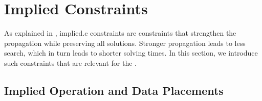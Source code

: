 \section{Implied Constraints}

As explained in , \gls{implied.c}
\glspl{constraint} are \glspl{constraint} that strengthen the \gls{propagation}
while preserving all \glspl{solution}.
%
Stronger \gls{propagation} leads to less \gls{search}, which in turn leads to
shorter solving times.
%
In this section, we introduce such \glspl{constraint} that are relevant for the
.


\subsection{Implied Operation and Data Placements}

